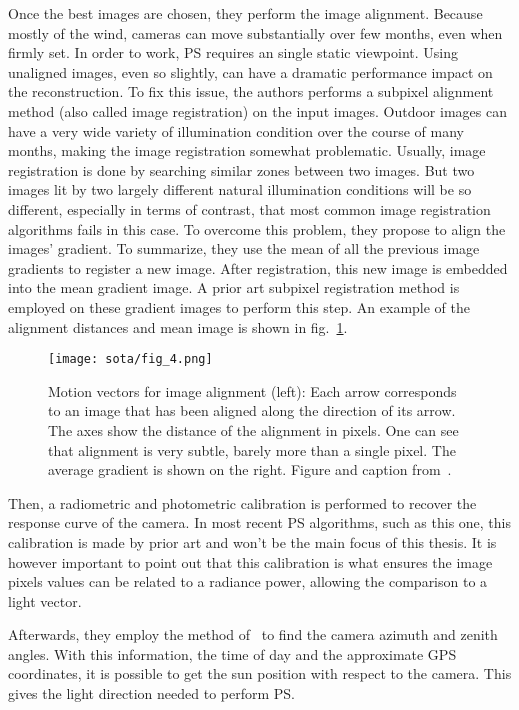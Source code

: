 Once the best images are chosen, they perform the image alignment. Because mostly of the wind, cameras can move substantially over few months, even when firmly set. In order to work, PS requires an single static viewpoint. Using unaligned images, even so slightly, can have a dramatic performance impact on the reconstruction. To fix this issue, the authors performs a subpixel alignment method (also called image registration) on the input images. Outdoor images can have a very wide variety of illumination condition over the course of many months, making the image registration somewhat problematic. Usually, image registration is done by searching similar zones between two images. But two images lit by two largely different natural illumination conditions will be so different, especially in terms of contrast, that most common image registration algorithms fails in this case. To overcome this problem, they propose to align the images' gradient. To summarize, they use the mean of all the previous image gradients to register a new image. After registration, this new image is embedded into the mean gradient image. A prior art subpixel registration method is employed on these gradient images to perform this step. An example of the alignment distances and mean image is shown in fig.~\ref{fig:ackermann-alignment}.

\begin{figure}
\centering
\texttt{[image: sota/fig\_4.png]}
\caption{Motion vectors for image alignment (left): Each arrow corresponds to an image that has been aligned along the direction of its arrow. The axes show the distance of the alignment in pixels. One can see that alignment is very subtle, barely more than a single pixel. The average gradient is shown on the right. Figure and caption from~\cite{ackermann-cvpr-12}.}
\label{fig:ackermann-alignment}
\end{figure}

Then, a radiometric and photometric calibration is performed to recover the response curve of the camera. In most recent PS algorithms, such as this one, this calibration is made by prior art and won't be the main focus of this thesis. It is however important to point out that this calibration is what ensures the image pixels values can be related to a radiance power, allowing the comparison to a light vector.

Afterwards, they employ the method of~\cite{lalonde-ijcv-10} to find the camera azimuth and zenith angles. With this information, the time of day and the approximate GPS coordinates, it is possible to get the sun position with respect to the camera. This gives the light direction needed to perform PS.

